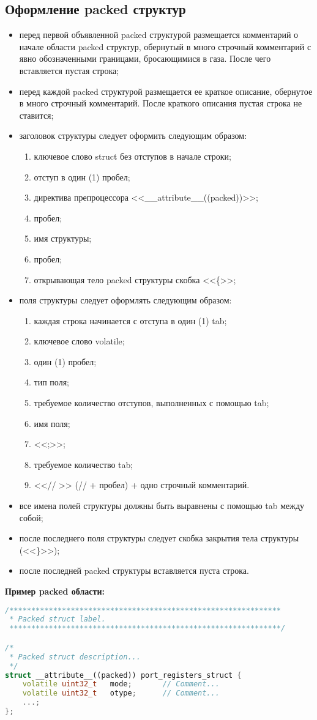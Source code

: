 \subsection{Оформление packed структур}
\begin{itemize}
	\item перед первой объявленной packed структурой размещается комментарий о начале области packed структур, обернутый в много строчный комментарий с явно обозначенными границами, бросающимися в газа. После чего вставляется пустая строка;
	\item перед каждой packed структурой размещается ее краткое описание, обернутое в много строчный комментарий. После краткого описания пустая строка не ставится;
	\item заголовок структуры следует оформить следующим образом:
	\begin{enumerate}
		\item ключевое слово struct без отступов в начале строки;
		\item отступ в один (1) пробел;
		\item директива препроцессора <<\_\_attribute\_\_((packed))>>;
		\item пробел;
		\item имя структуры;
		\item пробел;
		\item открывающая тело packed структуры скобка <<\{>>;
	\end{enumerate}
	\item поля структуры следует оформлять следующим образом:
	\begin{enumerate}
		\item каждая строка начинается с отступа в один (1) tab;
		\item ключевое слово volatile;
		\item один (1) пробел;
		\item тип поля;
		\item требуемое количество отступов, выполненных с помощью tab;
		\item имя поля;
		\item <<;>>;
		\item требуемое количество tab;
		\item <<// >> (// + пробел) + одно строчный комментарий.
	\end{enumerate}
	\item все имена полей структуры должны быть выравнены с помощью tab между собой;
	\item после последнего поля структуры следует скобка закрытия тела структуры (<<\}>>);
	\item после последней packed структуры вставляется пуста строка.
\end{itemize}\textbf{Пример packed области:}\begin{lstlisting}[language=C++, frame=tlBR, basicstyle=\fontsize{9}{9}\ttfamily]
/**************************************************************
 * Packed struct label.
 **************************************************************/

/*
 * Packed struct description...
 */
struct __attribute__((packed)) port_registers_struct {
	volatile uint32_t	mode;		// Comment...
	volatile uint32_t	otype;		// Comment...
	...;
};

\end{lstlisting}